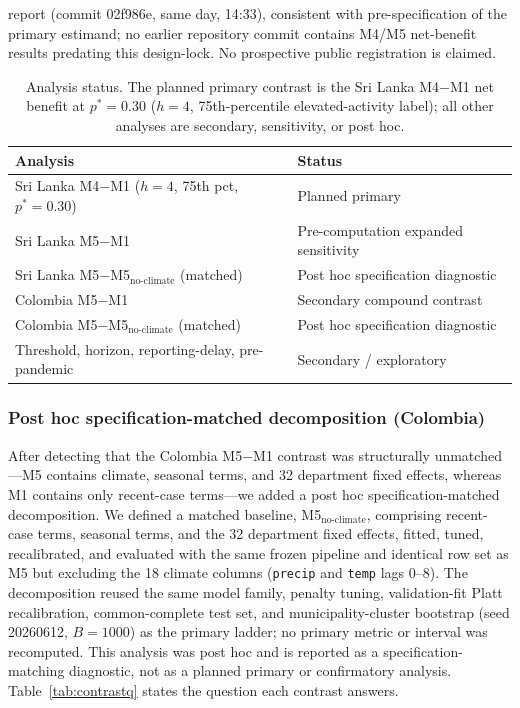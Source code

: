 \documentclass[11pt,a4paper]{article}
\begin{document}
report (commit 02f986e, same day, 14:33), consistent with pre-specification of the primary estimand; no earlier repository commit contains M4/M5 net-benefit results predating this design-lock. No prospective public registration is claimed.

\begin{table}[htbp]
\centering
\caption{Analysis status. The planned primary contrast is the Sri Lanka M4$-$M1 net benefit at $p^*=0.30$ ($h=4$, 75th-percentile elevated-activity label); all other analyses are secondary, sensitivity, or post hoc.}
\label{tab:analysisstatus}
\begin{tabular}{ll}
\hline
Analysis & Status \\
\hline
Sri Lanka M4$-$M1 ($h=4$, 75th pct, $p^*=0.30$) & Planned primary \\
Sri Lanka M5$-$M1 & Pre-computation expanded sensitivity \\
Sri Lanka M5$-$M5$_{\text{no-climate}}$ (matched) & Post hoc specification diagnostic \\
Colombia M5$-$M1 & Secondary compound contrast \\
Colombia M5$-$M5$_{\text{no-climate}}$ (matched) & Post hoc specification diagnostic \\
Threshold, horizon, reporting-delay, pre-pandemic & Secondary / exploratory \\
\hline
\end{tabular}
\end{table}

\subsubsection*{Post hoc specification-matched decomposition (Colombia)}
After detecting that the Colombia M5$-$M1 contrast was structurally unmatched---M5 contains climate, seasonal terms, and 32 department fixed effects, whereas M1 contains only recent-case terms---we added a post hoc specification-matched decomposition. We defined a matched baseline, M5$_{\text{no-climate}}$, comprising recent-case terms, seasonal terms, and the 32 department fixed effects, fitted, tuned, recalibrated, and evaluated with the same frozen pipeline and identical row set as M5 but excluding the 18 climate columns (\texttt{precip} and \texttt{temp} lags 0--8). The decomposition reused the same model family, penalty tuning, validation-fit Platt recalibration, common-complete test set, and municipality-cluster bootstrap (seed 20260612, $B=1000$) as the primary ladder; no primary metric or interval was recomputed. This analysis was post hoc and is reported as a specification-matching diagnostic, not as a planned primary or confirmatory analysis. Table~\ref{tab:contrastq} states the question each contrast answers.
\end{document}
